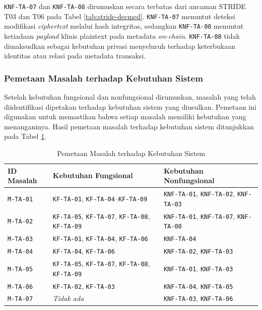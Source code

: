 \documentclass[bahasa, 12pt, a4paper, onecolumn, oneside, final]{report}
\begin{document}
\texttt{KNF-TA-07} dan \texttt{KNF-TA-08} dirumuskan secara terbatas dari ancaman STRIDE T03 dan T06 pada Tabel \ref{tab:stride-decmed}. \texttt{KNF-TA-07} menuntut deteksi modifikasi \textit{ciphertext} melalui hash integritas, sedangkan \texttt{KNF-TA-08} menuntut ketiadaan \textit{payload} klinis plaintext pada metadata \textit{on-chain}. \texttt{KNF-TA-08} tidak dimaksudkan sebagai kebutuhan privasi menyeluruh terhadap keterbukaan identitas atau relasi pada metadata transaksi.

\subsubsection{Pemetaan Masalah terhadap Kebutuhan Sistem}
\label{subsubsec:pemetaan-masalah-kebutuhan}

Setelah kebutuhan fungsional dan nonfungsional dirumuskan, masalah yang telah diidentifikasi dipetakan terhadap kebutuhan sistem yang diusulkan. Pemetaan ini digunakan untuk memastikan bahwa setiap masalah memiliki kebutuhan yang menanganinya. Hasil pemetaan masalah terhadap kebutuhan sistem ditunjukkan pada Tabel \ref{tab:pemetaan-masalah-kebutuhan}.

\begin{table}[!ht]
	\centering
	\caption{Pemetaan Masalah terhadap Kebutuhan Sistem}
	\label{tab:pemetaan-masalah-kebutuhan}
	\small
	\begin{tabular}{|p{}|p{}|p{}|}
		\hline
		\textbf{ID Masalah} & \textbf{Kebutuhan Fungsional}                                              & \textbf{Kebutuhan Nonfungsional}                           \\ \hline
		\texttt{M-TA-01}    & \texttt{KF-TA-01}, \texttt{KF-TA-04}--\texttt{KF-TA-09}                    & \texttt{KNF-TA-01}, \texttt{KNF-TA-02}, \texttt{KNF-TA-03} \\ \hline
		\texttt{M-TA-02}    & \texttt{KF-TA-05}, \texttt{KF-TA-07}, \texttt{KF-TA-08}, \texttt{KF-TA-09} & \texttt{KNF-TA-01}, \texttt{KNF-TA-07}, \texttt{KNF-TA-08} \\ \hline
		\texttt{M-TA-03}    & \texttt{KF-TA-01}, \texttt{KF-TA-04}, \texttt{KF-TA-06}                    & \texttt{KNF-TA-04}                                         \\ \hline
		\texttt{M-TA-04}    & \texttt{KF-TA-04}, \texttt{KF-TA-06}                                       & \texttt{KNF-TA-02}, \texttt{KNF-TA-03}                     \\ \hline
		\texttt{M-TA-05}    & \texttt{KF-TA-05}, \texttt{KF-TA-07}, \texttt{KF-TA-08}, \texttt{KF-TA-09} & \texttt{KNF-TA-01}, \texttt{KNF-TA-03}                     \\ \hline
		\texttt{M-TA-06}    & \texttt{KF-TA-02}, \texttt{KF-TA-03}                                       & \texttt{KNF-TA-04}, \texttt{KNF-TA-05}                     \\ \hline
		\texttt{M-TA-07}    & \textit{Tidak ada}                                                         & \texttt{KNF-TA-03}, \texttt{KNF-TA-06}                     \\ \hline
	\end{tabular}
\end{table}
\end{document}
